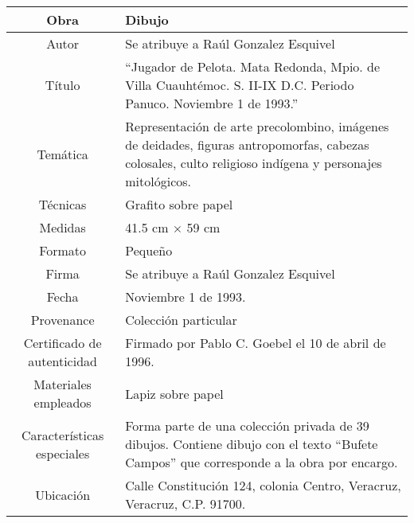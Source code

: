 \begin{table}[H]
\centering
\begin{tabular}{|c|m{}|}
\hline
Obra& Dibujo	\\
\hline
Autor & Se atribuye a Ra\'ul Gonzalez Esquivel\\
\hline
T\'itulo & ``Jugador de Pelota. Mata Redonda, Mpio. de Villa Cuauht\'emoc. S. II-IX D.C. Periodo Panuco. Noviembre 1 de 1993.''\\
\hline
Tem\'atica & Representaci\'on de arte precolombino, im\'agenes de deidades, figuras antropomorfas, cabezas colosales, culto religioso ind\'igena y personajes mitol\'ogicos.\\
\hline
T\'ecnicas &Grafito sobre papel \\
\hline
Medidas & 41.5 cm $\times$ 59 cm \\
\hline
 Formato & Peque\~no \\
 \hline
 Firma & Se atribuye a Ra\'ul Gonzalez Esquivel\\ 
 \hline
  Fecha & Noviembre 1 de 1993.\\
 \hline
 Provenance & Colecci\'on particular\\
 \hline
 Certificado de autenticidad& Firmado por Pablo C. Goebel el 10 de abril de 1996.  \\
 \hline 
  Materiales empleados & Lapiz sobre papel\\
 \hline
 Caracter\'isticas especiales & Forma parte de una colecci\'on privada de 39 dibujos. 
Contiene dibujo con el texto ``Bufete Campos'' que corresponde a la obra por encargo. \\
\hline 
Ubicaci\'on & Calle Constituci\'on 124, colonia Centro, Veracruz, Veracruz, C.P. 91700.\\
\hline

\end{tabular}
\end{table}

